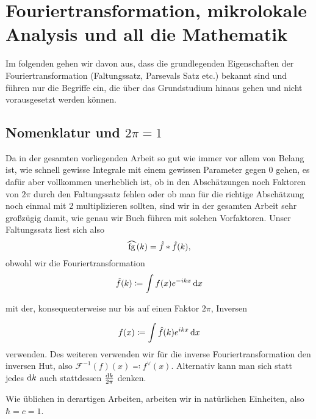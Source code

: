 
\section{Fouriertransformation, mikrolokale Analysis und all die Mathematik} %
\label{sec:fouriertransformation_mikrolokale_analysis_und_all_die_mathematik}
Im folgenden gehen wir davon aus, dass die grundlegenden Eigenschaften der Fouriertransformation (Faltungssatz, Parsevals Satz etc.) bekannt sind und führen nur die Begriffe ein, die über das Grundstudium hinaus gehen und nicht vorausgesetzt werden können.

\subsection{Nomenklatur und \texorpdfstring{$2 \pi = 1$}{2 Pi = 1}}
Da in der gesamten vorliegenden Arbeit so gut wie immer vor allem von Belang ist, wie schnell gewisse Integrale mit einem gewissen Parameter gegen 0 gehen, es dafür aber vollkommen unerheblich ist, ob in den Abschätzungen noch Faktoren von $2 \pi$ durch den Faltungssatz fehlen oder ob man für die richtige Abschätzung noch einmal mit 2 multiplizieren  sollten, sind wir in der gesamten Arbeit sehr großzügig damit, wie genau wir Buch führen mit solchen Vorfaktoren. Unser Faltungssatz liest sich also
\begin{equation*}
    \rwhat{fg} (k) = \hat f \ast \hat f (k),
\end{equation*}
obwohl wir die Fouriertransformation
\begin{equation*}
    \hat f (k) \coloneqq \int f(x)e^{-ikx} \mathop{}\!\mathrm{d} x
\end{equation*}

mit der, konsequenterweise nur bis auf einen Faktor $2 \pi$, Inversen

\begin{equation*}
    f (x) \coloneqq \int \hat f(k)e^{ikx} \mathop{}\!\mathrm{d} x
\end{equation*}
verwenden. Des weiteren verwenden wir für die inverse Fouriertransformation den inversen Hut, also $\mathcal{F}^{-1}(f)(x) \eqqcolon f^\vee (x)$. Alternativ kann man sich statt jedes $\mathop{}\!\mathrm{d} k$ auch stattdessen $\frac{\mathop{}\!\mathrm{d} k}{2 \pi}$ denken.

Wie üblichen in derartigen Arbeiten, arbeiten wir in natürlichen Einheiten, also $\hbar = c = 1$.

